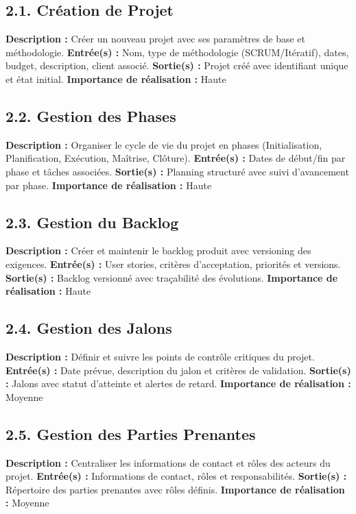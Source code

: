 \subsection{2.1. Création de Projet}
\textbf{Description :} Créer un nouveau projet avec ses paramètres de base et méthodologie.
\textbf{Entrée(s) :} Nom, type de méthodologie (SCRUM/Itératif), dates, budget, description, client associé.
\textbf{Sortie(s) :} Projet créé avec identifiant unique et état initial.
\textbf{Importance de réalisation :} Haute

\subsection{2.2. Gestion des Phases}
\textbf{Description :} Organiser le cycle de vie du projet en phases (Initialisation, Planification, Exécution, Maîtrise, Clôture).
\textbf{Entrée(s) :} Dates de début/fin par phase et tâches associées.
\textbf{Sortie(s) :} Planning structuré avec suivi d'avancement par phase.
\textbf{Importance de réalisation :} Haute

\subsection{2.3. Gestion du Backlog}
\textbf{Description :} Créer et maintenir le backlog produit avec versioning des exigences.
\textbf{Entrée(s) :} User stories, critères d'acceptation, priorités et versions.
\textbf{Sortie(s) :} Backlog versionné avec traçabilité des évolutions.
\textbf{Importance de réalisation :} Haute

\subsection{2.4. Gestion des Jalons}
\textbf{Description :} Définir et suivre les points de contrôle critiques du projet.
\textbf{Entrée(s) :} Date prévue, description du jalon et critères de validation.
\textbf{Sortie(s) :} Jalons avec statut d'atteinte et alertes de retard.
\textbf{Importance de réalisation :} Moyenne

\subsection{2.5. Gestion des Parties Prenantes}
\textbf{Description :} Centraliser les informations de contact et rôles des acteurs du projet.
\textbf{Entrée(s) :} Informations de contact, rôles et responsabilités.
\textbf{Sortie(s) :} Répertoire des parties prenantes avec rôles définis.
\textbf{Importance de réalisation :} Moyenne

